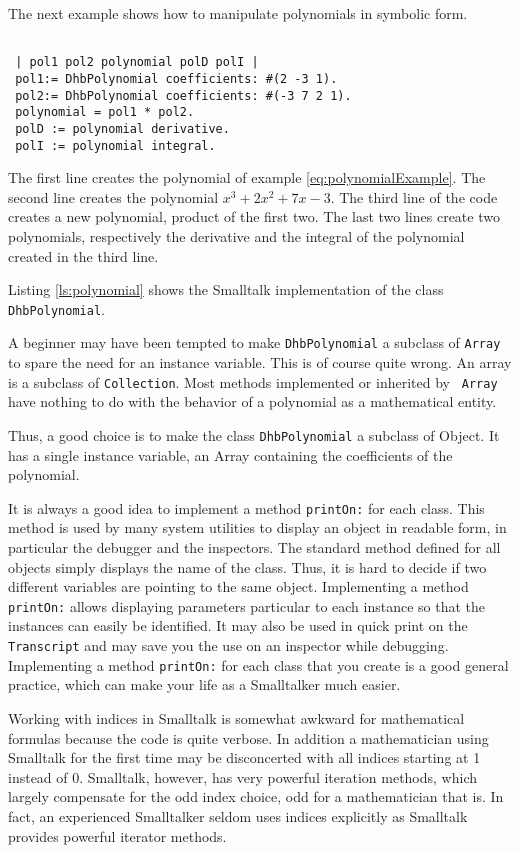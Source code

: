 \documentclass[twoside]{book}
\begin{document}
The next example shows how to manipulate polynomials in symbolic
form.
\begin{codeExample}
\begin{verbatim}

 | pol1 pol2 polynomial polD polI |
 pol1:= DhbPolynomial coefficients: #(2 -3 1).
 pol2:= DhbPolynomial coefficients: #(-3 7 2 1).
 polynomial = pol1 * pol2.
 polD := polynomial derivative.
 polI := polynomial integral.
\end{verbatim}
\end{codeExample}
The first line creates the  polynomial of example
\ref{eq:polynomialExample}. The second line creates the polynomial
$x^3+2x^2+7x-3$. The third line of the code creates a new
polynomial, product of the first two. The last two lines create
two polynomials, respectively the derivative and the integral of
the polynomial created in the third line.

Listing \ref{ls:polynomial} shows the Smalltalk implementation of
the class {\tt DhbPolynomial}.

A beginner may have been tempted to make {\tt DhbPolynomial} a
subclass of {\tt Array} to spare the need for an instance
variable. This is of course quite wrong. An array is a subclass of
{\tt Collection}. Most methods implemented or inherited by {\tt
Array} have nothing to do with the behavior of a polynomial as a
mathematical entity.

Thus, a good choice is to make the class {\tt DhbPolynomial} a
subclass of Object. It has a single instance variable, an Array
containing the coefficients of the polynomial.

It is always a good idea to implement a method {\tt printOn:} for
each class. This method is used by many system utilities to
display an object in readable form, in particular the debugger and
the inspectors. The standard method defined for all objects simply
displays the name of the class. Thus, it is hard to decide if two
different variables are pointing to the same object. Implementing
a method {\tt printOn:} allows displaying parameters particular to
each instance so that the instances can easily be identified. It
may also be used in quick print on the {\tt Transcript} and may
save you the use on an inspector while debugging. Implementing a
method {\tt printOn:} for each class that you create is a good
general practice, which can make your life as a Smalltalker much
easier.

Working with indices in Smalltalk is somewhat awkward for
mathematical formulas because the code is quite verbose. In
addition a mathematician using Smalltalk for the first time may be
disconcerted with all indices starting at 1 instead of 0.
Smalltalk, however, has very powerful iteration methods, which
largely compensate for the odd index choice, odd for a
mathematician that is. In fact, an experienced Smalltalker seldom
uses indices explicitly as Smalltalk provides powerful iterator
methods.
\end{document}
